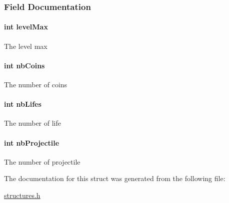 \subsubsection{Field Documentation}
\hypertarget{struct_player_a239aaece8decb78587f72db6166743ca}{
\paragraph[{level\-Max}]{\setlength{\rightskip}{0pt plus 5cm}int level\-Max}}\label{struct_player_a239aaece8decb78587f72db6166743ca}
The level max \hypertarget{struct_player_a90f72e24f08427f541b92bfc5a7982d3}{
\paragraph[{nb\-Coins}]{\setlength{\rightskip}{0pt plus 5cm}int nb\-Coins}}\label{struct_player_a90f72e24f08427f541b92bfc5a7982d3}
The number of coins \hypertarget{struct_player_ae4069fd5e08497b888237e5eb9f2e4ad}{
\paragraph[{nb\-Lifes}]{\setlength{\rightskip}{0pt plus 5cm}int nb\-Lifes}}\label{struct_player_ae4069fd5e08497b888237e5eb9f2e4ad}
The number of life \hypertarget{struct_player_a803fd7edf0558a9e0dc73e6351ad85d0}{
\paragraph[{nb\-Projectile}]{\setlength{\rightskip}{0pt plus 5cm}int nb\-Projectile}}\label{struct_player_a803fd7edf0558a9e0dc73e6351ad85d0}
The number of projectile 

The documentation for this struct was generated from the following file\-:\begin{DoxyCompactItemize}
\item 
\hyperlink{structures_8h}{structures.\-h}\end{DoxyCompactItemize}
